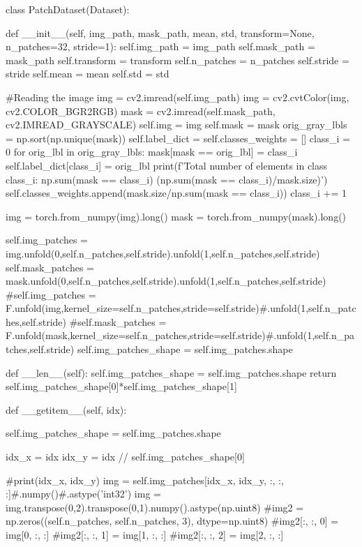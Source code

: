 \documentclass[10pt, a4paper]{article}
\begin{document}
\begin{python}
class PatchDataset(Dataset):
    
    def __init__(self, img_path, mask_path, mean, std, transform=None, n_patches=32, stride=1):
        self.img_path = img_path
        self.mask_path = mask_path
        self.transform = transform
        self.n_patches = n_patches
        self.stride = stride
        self.mean = mean
        self.std = std

        #Reading the image
        img = cv2.imread(self.img_path)
        img = cv2.cvtColor(img, cv2.COLOR_BGR2RGB)
        mask = cv2.imread(self.mask_path, cv2.IMREAD_GRAYSCALE)
        self.img = img
        self.mask = mask
        orig_gray_lbls = np.sort(np.unique(mask))
        self.label_dict = {}
        self.classes_weights = []
        class_i = 0
        for orig_lbl in orig_gray_lbls:
          mask[mask == orig_lbl] = class_i
          self.label_dict[class_i] = orig_lbl
          print(f'Total number of elements in class {class_i}: {np.sum(mask == class_i)} ({np.sum(mask == class_i)/mask.size})')
          self.classes_weights.append(mask.size/np.sum(mask == class_i))
          class_i += 1
        
        img = torch.from_numpy(img).long()
        mask = torch.from_numpy(mask).long()

        self.img_patches = img.unfold(0,self.n_patches,self.stride).unfold(1,self.n_patches,self.stride)
        self.mask_patches = mask.unfold(0,self.n_patches,self.stride).unfold(1,self.n_patches,self.stride)
        #self.img_patches = F.unfold(img,kernel_size=self.n_patches,stride=self.stride)#.unfold(1,self.n_patches,self.stride)
        #self.mask_patches = F.unfold(mask,kernel_size=self.n_patches,stride=self.stride)#.unfold(1,self.n_patches,self.stride)
        self.img_patches_shape = self.img_patches.shape
        
    def __len__(self):
        self.img_patches_shape = self.img_patches.shape
        return self.img_patches_shape[0]*self.img_patches_shape[1]
    
    def __getitem__(self, idx):

        self.img_patches_shape = self.img_patches.shape
        
        idx_x = idx %
        idx_y = idx // self.img_patches_shape[0]

        #print(idx_x, idx_y)
        img = self.img_patches[idx_x, idx_y, :, :, :]#.numpy()#.astype('int32')
        img = img.transpose(0,2).transpose(0,1).numpy().astype(np.uint8)
        #img2 = np.zeros((self.n_patches, self.n_patches, 3), dtype=np.uint8)
        #img2[:, :, 0] = img[0, :, :]
        #img2[:, :, 1] = img[1, :, :]
        #img2[:, :, 2] = img[2, :, :]


\end{python}
\end{document}
